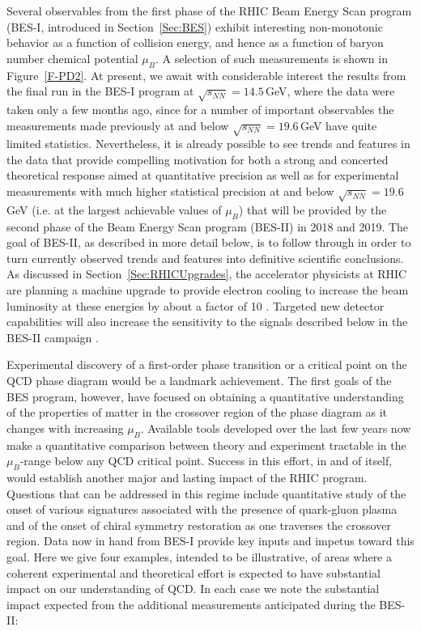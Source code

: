 Several observables from the
first phase of the RHIC Beam Energy Scan program (BES-I, introduced
in Section~\ref{Sec:BES})
exhibit interesting 
non-monotonic behavior as a function of collision energy,
and hence as a function of baryon number chemical potential $\mu_B$.
A selection of such measurements is shown in Figure~\ref{F-PD2}.  
At present, we await with considerable interest
the results from the final run in
the BES-I program at $\sqrt{s_{NN}}=14.5$\,GeV, where the data were taken only
a few months ago, since for a number of important observables the
measurements made previously at and below $\sqrt{s_{NN}}=19.6$\,GeV 
have quite
limited statistics. Nevertheless, it is already possible to see trends
and features in the data that provide compelling motivation 
for both a strong and concerted theoretical response aimed at quantitative
precision as well as for experimental measurements with much higher statistical precision at 
and below $\sqrt{s_{NN}}=19.6$\,GeV 
(i.e. at the largest achievable values of $\mu_B$)
that will be provided by the second phase of the Beam Energy Scan
program (BES-II) in 2018 and 2019. The goal of BES-II, as described
in more detail below, is to follow through in order to turn currently observed trends and
features into definitive scientific conclusions. As discussed in Section~\ref{Sec:RHICUpgrades}, 
the accelerator physicists at RHIC are planning a machine upgrade to
provide electron cooling to increase the beam luminosity at these
energies by about a factor of 10 \cite{BESII}. Targeted new detector
capabilities will also increase the sensitivity to the signals
described below in the BES-II campaign \cite{BESII}.

Experimental discovery of a first-order phase transition or a critical
point on the QCD phase diagram would be a landmark achievement. The
first goals of the BES program, however, have focused on obtaining a quantitative 
understanding of the properties of matter in the crossover region of the 
phase diagram as it changes with increasing $\mu_B$. Available tools
developed over the last few years now make a quantitative comparison
between theory and experiment tractable in the $\mu_B$-range
below any QCD critical point. Success in this effort, in and of itself, would
establish another major and lasting impact of the RHIC program. Questions
that can be addressed in this regime include quantitative study of the
onset of various signatures associated with the presence of
quark-gluon plasma and of the onset of chiral symmetry restoration as
one traverses the crossover region. Data now in hand from BES-I
provide key inputs and impetus toward this goal. Here we give four
examples, intended to be illustrative, of areas where a coherent
experimental and theoretical effort is expected to have substantial
impact on our understanding of QCD. In each case we note the
substantial impact expected from the additional measurements
anticipated during the BES-II:

